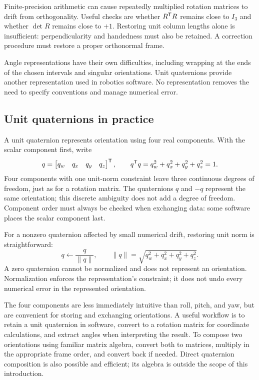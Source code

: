 Finite-precision arithmetic can cause repeatedly multiplied rotation matrices
to drift from orthogonality. Useful checks are whether $R^{\mathsf T} R$ remains
close to $I_3$ and whether $\det R$ remains close to $+1$. Restoring unit
column lengths alone is insufficient: perpendicularity and handedness must
also be retained. A correction procedure must restore a proper orthonormal frame.

Angle representations have their own difficulties, including wrapping at the
ends of the chosen intervals and singular orientations. Unit quaternions
provide another representation used in robotics software. No representation
removes the need to specify conventions and manage numerical error.

\subsection{Unit quaternions in practice}
A unit quaternion represents orientation using four real components. With
the scalar component first, write
\begin{equation}
 q=\begin{bmatrix}q_w&q_x&q_y&q_z\end{bmatrix}^{\mathsf T},
 \qquad q^{\mathsf T} q=q_w^2+q_x^2+q_y^2+q_z^2=1.
 \label{eq:l04-quaternion}
\end{equation}
Four components with one unit-norm constraint leave three continuous degrees
of freedom, just as for a rotation matrix. The quaternions $q$ and $-q$
represent the same orientation; this discrete ambiguity does not add a degree
of freedom. Component order must always be checked when exchanging data:
some software places the scalar component last.

For a nonzero quaternion affected by small numerical drift, restoring unit
norm is straightforward:
\[
 q\leftarrow\frac{q}{\|q\|},\qquad
 \|q\|=\sqrt{q_w^2+q_x^2+q_y^2+q_z^2}.
\]
A zero quaternion cannot be normalized and does not represent an orientation.
Normalization enforces the representation's constraint; it does not undo
every numerical error in the represented orientation.

The four components are less immediately intuitive than roll, pitch, and yaw,
but are convenient for storing and exchanging orientations. A useful workflow
is to retain a unit quaternion in software, convert to a rotation matrix for
coordinate calculations, and extract angles when interpreting the result.
To compose two orientations using familiar matrix algebra, convert both to
matrices, multiply in the appropriate frame order, and convert back if needed.
Direct quaternion composition is also possible and efficient; its algebra is
outside the scope of this introduction.

